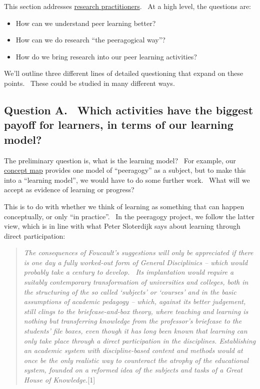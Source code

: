 This section addresses
\href{http://edfutures.net/index.php?title=Practitioner\_Research}{research
practitioners}.~ At a high level, the questions are:

\begin{itemize}
\item
  How can we understand peer learning better?
\item
  How can we do research ``the peeragogical way''?
\item
  How do we bring research into our peer learning activities?
\end{itemize}

We'll outline three different lines of detailed questioning that expand
on these points.~ These could be studied in many different ways.

\subsection{Question A. ~Which activities have the biggest payoff for
learners, in terms of our learning model?}

The preliminary question is, what is the learning model?~ For example,
our
\href{http://cmapspublic3.ihmc.us/rid=1K81VLSK7-1RL0RQ4-WZK/Peeragogy\%20Cmap.cmap}{concept
map} provides one model of ``peeragogy'' as a subject, but to make this
into a ``learning model'', we would have to do some further work.~ What
will we accept as evidence of learning or progress?

This is to do with whether we think of learning as something that can
happen conceptually, or only ``in practice''.~ In the peeragogy project,
we follow the latter view, which is in line with what Peter Sloterdijk
says about learning through direct participation:

\begin{quote}
\emph{The consequences of Foucault's suggestions will only be
appreciated if there is one day a fully worked-out form of General
Disciplinics -- which would probably take a century to develop. ~Its
implantation would require a suitably contemporary transformation of
universities and colleges, both in the structuring of the so called
`subjects' or `courses' and in the basic assumptions of academic
pedagogy -- which, against its better judgement, still clings to the
briefcase-and-box theory, where teaching and learning is nothing but
transferring knowledge from the professor's briefcase to the students'
file boxes, even though it has long been known that learning can only
take place through a direct participation in the disciplines.
Establishing an academic system with discipline-based content and
methods would at once be the only realistic way to counteract the
atrophy of the educational system, founded on a reformed idea of the
subjects and tasks of a Great House of Knowledge.}{[}1{]}\emph{}
\end{quote}

